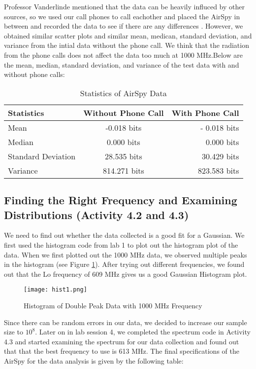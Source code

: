\documentclass[10pt, preprint]{aastex}
\begin{document}
Professor Vanderlinde mentioned that the data can be heavily influced by other sources, so we used our call phones to call eachother and placed the AirSpy in between and recorded the data to see if there are any differences \cite{ast325lecture5}. However, we obtained similar scatter plots and similar mean, medican, standard deviation, and variance from the intial data without the phone call. We think that the radiation from the phone calls does not affect the data too much at 1000 MHz.Below are the mean, median, standard deviation, and variance of the test data with and without phone calls:

\begin{table}[H]
\centering
\footnotesize
\begin{tabular}{lcr}
\hline
Statistics & Without Phone Call & With Phone Call\\\hline
Mean & -0.018 bits & - 0.018 bits \\
Median & 0.000 bits & 0.000 bits\\
Standard Deviation & 28.535 bits & 30.429 bits\\
Variance & 814.271 bits & 823.583 bits\\

\end{tabular}
\caption{\label{table:CCDSettings4.2.2}Statistics of AirSpy Data}
\end{table}

\subsection{Finding the Right Frequency and Examining Distributions (Activity 4.2 and 4.3)}

We need to find out whether the data collected is a good fit for a Gaussian. We first used the histogram code from lab 1 to plot out the histogram plot of the data. When we first plotted out the 1000 MHz data, we observed multiple peaks in the histogram (see Figure \ref{fig:hist1}). After trying out different frequencies, we found out that the Lo frequency of 609 MHz gives us a good Gaussian Histogram plot. 

\begin{figure}[H]
\centering
\texttt{[image: hist1.png]}
\caption{\label{fig:hist1}Histogram of Double Peak Data with 1000 MHz Frequency}
\end{figure}
Since there can be random errors in our data, we decided to increase our sample size to $10^8$. Later on in lab session 4, we completed the spectrum code in Activity 4.3 and started examining the spectrum for our data collection and found out that that the best frequency to use is 613 MHz. The final specifications of the AirSpy for the data analysis is given by the following table:
\end{document}
